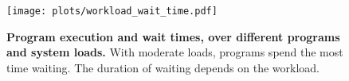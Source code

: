 \begin{figure}[t]
\centering
\texttt{[image: plots/workload\_wait\_time.pdf]}

\vspace{-2mm}
\caption{\small \textbf{Program execution and wait times, over different programs and system loads.} With moderate loads, programs spend the most time waiting. The duration of waiting depends on the workload.}
\vspace{-5mm}
\label{fig:high_load_wait_times}
\end{figure}
